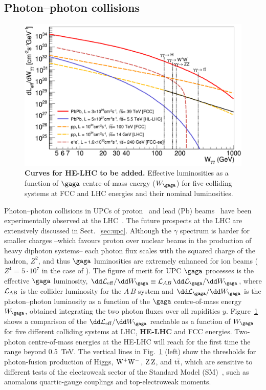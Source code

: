 \documentclass[../report.tex]{subfiles}
\begin{document}
\subsection{Photon--photon collisions}
\label{sec:HE_gammagamma}

\begin{figure}[!t]
\centering
\includegraphics[width=0.52\columnwidth]{helhc/figs/lumi_gammagamma_fcc_ions.pdf}
\caption{{\bf Curves for HE-LHC to be added.} Effective luminosities as a function of $\gaga$ centre-of-mass energy ($W_{\gaga}$) for five
  colliding systems at FCC and LHC energies and their nominal
  luminosities.}
\label{fig:gamgam_lumi}
\end{figure}


Photon--photon collisions in UPCs of proton~\cite{dEnterria:2008sh} 
and lead (Pb) beams~\cite{Baltz:2007kq} have been experimentally observed at the
LHC~\cite{Chatrchyan:2012tv,Chatrchyan:2013foa,Abbas:2013oua,Aad:2015bwa}.
The future prospects at the LHC are extensively discussed in Sect.~\ref{sec:upc}. 
Although the $\gamma$ spectrum is harder for smaller charges --which favours proton over nuclear beams in the
production of heavy diphoton systems-- each photon flux scales with the squared charge of the hadron, $Z^2$, and
thus $\gaga$ luminosities are extremely enhanced for ion beams
($Z^4=5\cdot 10^{7}$ in the case of
\PbPb). 
The figure of merit for UPC $\gaga$ processes is the effective $\gaga$ luminosity, 
$\dd\mathcal{L}_{\rm eff}/\dd W_{\gaga} \equiv
\mathcal{L}_{AB}\,\dd\mathcal{L}_{\gaga}/\dd W_{\gaga}$, where ${\cal L}_{\rm AB}$ is the
collider luminosity for the $A$\,$B$ system and
$\dd\mathcal{L}_{\gaga}/\dd W_{\gaga}$ is the photon--photon luminosity
as a function of the $\gaga$ centre-of-mass energy $W_{\gaga}$, obtained integrating the two photon fluxes over all
rapidities $y$.
Figure~\ref{fig:gamgam_lumi} shows a comparison of the $\dd\mathcal{L}_{\rm eff}/\dd W_{\gaga}$ reachable as a
function of $W_{\gaga}$ for five different colliding systems at LHC,
{\bf HE-LHC} and FCC energies. Two-photon centre-of-mass
energies at the HE-LHC will reach for the first time the range beyond 0.5~TeV. 
The
vertical lines in Fig.~\ref{fig:gamgam_lumi} (left) show the thresholds for photon-fusion production of Higgs,
$\rm W^+W^-$, $\rm Z\,Z$, and $\rm t\overline t$, which are sensitive to different tests of the electroweak sector of
the Standard Model (SM)~\cite{dEnterria:2017qte}, such as anomalous quartic-gauge couplings and top-electroweak
moments.
\end{document}
